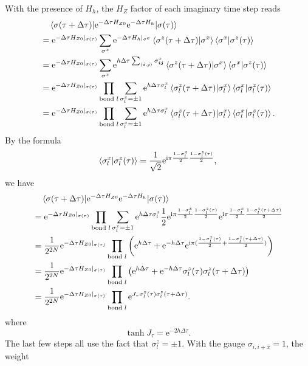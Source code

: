 \documentclass[hyperref, a4paper]{article}
\newcommand*{\ii}{\mathrm{i}}
\newcommand*{\ee}{\mathrm{e}}
\newcommand*{\pair}[1]{\langle #1 \rangle}
\begin{document}
With the presence of $H_h$, the $H_Z$ factor of each imaginary time step reads
\[
    \begin{aligned}
        &\quad \mel{\sigma(\tau + \Delta \tau)}{\ee^{-\Delta \tau H_{Z0}} \ee^{-\Delta \tau H_h}}{\sigma(\tau)} \\ 
        &= \ee^{-\Delta \tau H_{Z0}|_{\sigma(\tau)}} \sum_{\sigma^x} \ee^{-\Delta \tau H_h|_{\sigma^x}} \braket{\sigma^z(\tau+\Delta \tau)}{\sigma^x} \braket{\sigma^x}{\sigma^z(\tau)} \\
        &= \ee^{-\Delta \tau H_{Z0}|_{\sigma(\tau)}} \sum_{\sigma^x} \ee^{h \Delta \tau \sum_{\pair{\vb*{i}, \vb*{j}}} \sigma^x_{\vb*{i} \vb*{j}}} \braket{\sigma^z(\tau+\Delta \tau)}{\sigma^x} \braket{\sigma^x}{\sigma^z(\tau)} \\
        &= \ee^{-\Delta \tau H_{Z0}|_{\sigma(\tau)}} \prod_{\text{bond } l} \sum_{\sigma^x_l =\pm 1} \ee^{h \Delta \tau \sigma^x_l} \braket{\sigma^z_l(\tau+\Delta \tau)}{\sigma^x_l} \braket{\sigma^x_l}{\sigma^z_l(\tau)} \\
        &= \ee^{-\Delta \tau H_{Z0}|_{\sigma(\tau)}} \prod_{\text{bond } l} \sum_{\sigma^x_l =\pm 1} \ee^{h \Delta \tau \sigma^x_l} \braket{\sigma^z_l(\tau+\Delta \tau)}{\sigma^x_l} \braket{\sigma^x_l}{\sigma^z_l(\tau)}.
    \end{aligned}
\]
By the formula
\[
    \braket{\sigma^x_l}{\sigma^z_l(\tau)} = \frac{1}{\sqrt{2}} \ee^{\ii \pi \frac{1 - \sigma^x_l}{2} \frac{1 - \sigma^z_l(\tau)}{2}} ,
\]
we have
\[
    \begin{aligned}
        &\quad \mel{\sigma(\tau + \Delta \tau)}{\ee^{-\Delta \tau H_{Z0}} \ee^{-\Delta \tau H_h}}{\sigma(\tau)} \\
        &= \ee^{-\Delta \tau H_{Z0}|_{\sigma(\tau)}} \prod_{\text{bond } l} \sum_{\sigma^x_l =\pm 1} \ee^{h \Delta \tau \sigma^x_l} \frac{1}{2} \ee^{\ii \pi \frac{1 - \sigma^x_l}{2} \frac{1 - \sigma^z_l(\tau)}{2}} \ee^{\ii \pi  \frac{1 - \sigma^x_l}{2} \frac{1 - \sigma^z_l(\tau + \Delta \tau)}{2}} \\
        &= \frac{1}{2^{2N}} \ee^{-\Delta \tau H_{Z0}|_{\sigma(\tau)}} \prod_{\text{bond } l} \left( \ee^{h \Delta \tau} + \ee^{- h \Delta \tau} \ee^{\ii \pi (\frac{1 - \sigma^z_l(\tau)}{2} + \frac{1 - \sigma^z_l(\tau + \Delta \tau)}{2})} \right) \\
        &= \frac{1}{2^{2N}} \ee^{-\Delta \tau H_{Z0}|_{\sigma(\tau)}} \prod_{\text{bond } l} \left( \ee^{h \Delta \tau} + \ee^{- h \Delta \tau} \sigma_l^z(\tau) \sigma_l^z(\tau + \Delta \tau) \right) \\
        &= \frac{1}{2^{2N}} \ee^{-\Delta \tau H_{Z0}|_{\sigma(\tau)}} \prod_{\text{bond } l} \ee^{J_\tau \sigma_l^z(\tau) \sigma_l^z(\tau + \Delta \tau)}.
    \end{aligned}
\]
where 
\begin{equation}
    \tanh J_\tau = \ee^{-2 h \Delta \tau}.
\end{equation}
The last few steps all use the fact that $\sigma^z_l = \pm 1$.
With the gauge $\sigma_{i, i+\hat{x}} = 1$, the weight 
\end{document}
